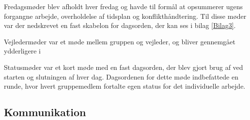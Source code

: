 Fredagsmøder blev afholdt hver fredag og havde til formål at opsummerer ugens forgangne arbejde, overholdelse af tidsplan og konflikthåndtering. Til disse møder var der nedskrevet en fast skabelon for dagsorden, der kan ses i bilag \ref{Bilag3}.

Vejledermøder var et møde mellem gruppen og vejleder, og bliver gennemgået ydderligere i 

Statusmøder var et kort møde med en fast dagsorden, der blev gjort brug af ved starten og slutningen af hver dag. Dagsordenen for dette møde indbefattede en runde, hvor hvert gruppemedlem fortalte egen status for det individuelle arbejde.

\subsection{Kommunikation}
